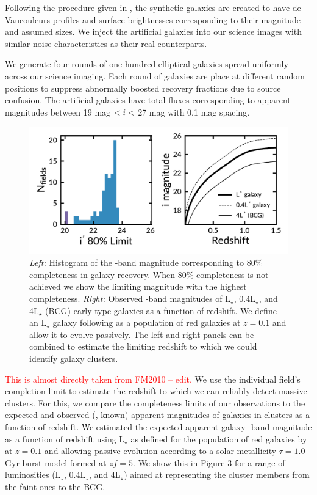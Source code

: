 \documentclass[apj, revtex4]{emulateapj}
\newcommand{\editorial}[1]{\textcolor{red}{#1}}
\begin{document}
Following the procedure given in \cite{Menanteau2010a}, the synthetic galaxies are created to have de Vaucouleurs \citep{DeVaucouleurs1948} profiles and surface brightnesses corresponding to their magnitude and assumed sizes. We inject the artificial galaxies into our science images with similar noise characteristics as their real counterparts.

We generate four rounds of one hundred elliptical galaxies spread uniformly across our science imaging. Each round of galaxies are place at different random positions to suppress abnormally boosted recovery fractions due to source confusion. The artificial galaxies have total fluxes corresponding to apparent magnitudes between 19 mag $< \hbox{$i$} <$ 27 mag with 0.1 mag spacing. 

\begin{figure} 
	\includegraphics[width=\textwidth]{figures/recovery_redshift.pdf} 
	\caption{\textit{Left:} Histogram of the \sdssi-band magnitude corresponding to 80\% completeness in galaxy recovery. When 80\% completeness is not achieved we show the limiting magnitude with the highest completeness. \textit{Right:} Observed \sdssi-band magnitudes of L$_{\star}$, 0.4L$_{\star}$, and 4L$_{\star}$ (BCG) early-type galaxies as a function of redshift. We define an L$_{\star}$ galaxy following \cite{Blanton2003} as a population of red galaxies at $z = 0.1$ and allow it to evolve passively. The left and right panels can be combined to estimate the limiting redshift to which we could identify galaxy clusters.}
	\label{fig:recovery_redshift} 
\end{figure}

\editorial{This is almost directly taken from FM2010 -- edit.} We use the individual field's completion limit to estimate the redshift to which we can reliably detect massive clusters. For this, we compare the completeness limits of our observations to the expected and observed (\ie, known) apparent magnitudes of galaxies in clusters as a function of redshift. We estimated the expected apparent galaxy \sdssi-band magnitude as a function of redshift using L$_{\star}$ as defined for the population of red galaxies by \cite{Blanton2003} at $z = 0.1$ and allowing passive evolution according to a solar metallicity \citep{Bruzual2003} $\tau = 1.0$ Gyr burst model formed at $zf = 5$. We show this in Figure 3 for a range of luminosities (L$_{\star}$, 0.4L$_{\star}$, and 4L$_{\star}$) aimed at representing the cluster members from the faint ones to the BCG.
\end{document}

